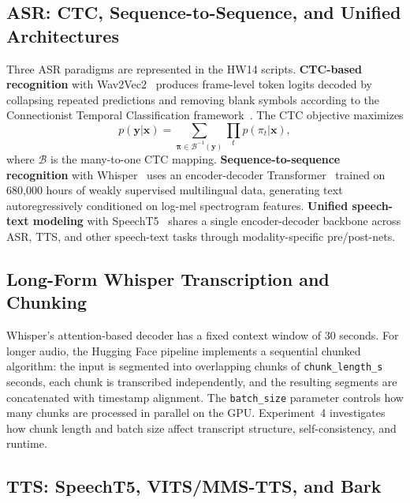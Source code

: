 \documentclass[conference]{IEEEtran}
\begin{document}
\subsection{ASR: CTC, Sequence-to-Sequence, and Unified Architectures}

Three ASR paradigms are represented in the HW14 scripts. \textbf{CTC-based recognition} with Wav2Vec2~\cite{baevski2020} produces frame-level token logits decoded by collapsing repeated predictions and removing blank symbols according to the Connectionist Temporal Classification framework~\cite{graves2006}. The CTC objective maximizes
\begin{equation}
p(\mathbf{y} | \mathbf{x}) = \sum_{\boldsymbol{\pi} \in \mathcal{B}^{-1}(\mathbf{y})} \prod_{t} p(\pi_t | \mathbf{x}),
\end{equation}
where $\mathcal{B}$ is the many-to-one CTC mapping. \textbf{Sequence-to-sequence recognition} with Whisper~\cite{radford2023} uses an encoder-decoder Transformer~\cite{vaswani2017} trained on 680,000 hours of weakly supervised multilingual data, generating text autoregressively conditioned on log-mel spectrogram features. \textbf{Unified speech-text modeling} with SpeechT5~\cite{ao2022} shares a single encoder-decoder backbone across ASR, TTS, and other speech-text tasks through modality-specific pre/post-nets.

\subsection{Long-Form Whisper Transcription and Chunking}

Whisper's attention-based decoder has a fixed context window of 30 seconds. For longer audio, the Hugging Face pipeline implements a sequential chunked algorithm: the input is segmented into overlapping chunks of \texttt{chunk\_length\_s} seconds, each chunk is transcribed independently, and the resulting segments are concatenated with timestamp alignment. The \texttt{batch\_size} parameter controls how many chunks are processed in parallel on the GPU. Experiment~4 investigates how chunk length and batch size affect transcript structure, self-consistency, and runtime.

\subsection{TTS: SpeechT5, VITS/MMS-TTS, and Bark}
\end{document}

